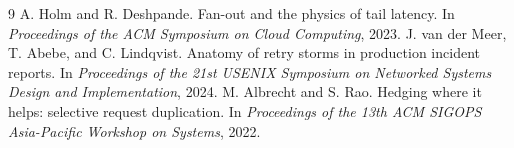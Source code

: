 \documentclass[10pt,twocolumn]{article}
\begin{document}
\begin{thebibliography}{9}
 A. Holm and R. Deshpande.
Fan-out and the physics of tail latency.
In \textit{Proceedings of the ACM Symposium on Cloud Computing}, 2023.
 J. van der Meer, T. Abebe, and C. Lindqvist.
Anatomy of retry storms in production incident reports.
In \textit{Proceedings of the 21st USENIX Symposium on Networked Systems Design and Implementation}, 2024.
 M. Albrecht and S. Rao.
Hedging where it helps: selective request duplication.
In \textit{Proceedings of the 13th ACM SIGOPS Asia-Pacific Workshop on Systems}, 2022.
\end{thebibliography}
\end{document}
